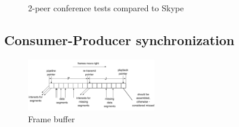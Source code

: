 \documentclass{icn/sig-alternate-2013} %
\begin{document}

%

\begin{figure}[t!]
\centering
\begin{scriptsize}
\def\svgwidth{0.53\textwidth}
\end{scriptsize}
\vspace{-18pt}
\caption{2-peer conference tests compared to Skype}
\label{fig:tests-skype}
\end{figure}






\subsection{Consumer-Producer synchronization}

\begin{figure}[t!]
\centering
\includegraphics[width=0.5\textwidth]{buffer}
\caption{Frame buffer}
\label{fig:old-buf}
\end{figure}
\end{document}
